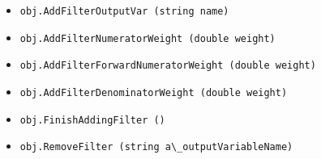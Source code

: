 \begin{itemize}
\item  \verb|obj.AddFilterOutputVar (string name)|

\item  \verb|obj.AddFilterNumeratorWeight (double weight)|

\item  \verb|obj.AddFilterForwardNumeratorWeight (double weight)|

\item  \verb|obj.AddFilterDenominatorWeight (double weight)|

\item  \verb|obj.FinishAddingFilter ()|

\item  \verb|obj.RemoveFilter (string a\_outputVariableName)|

\end{itemize}
